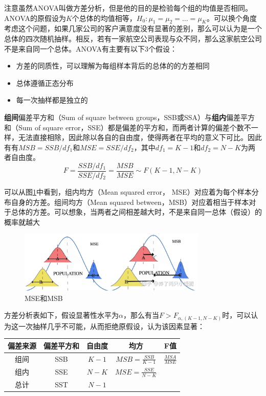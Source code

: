 \documentclass[11pt]{article}
\begin{document}
注意虽然ANOVA叫做方差分析，但是他的目的是检验每个组的均值是否相同。ANOVA的原假设为$K$个总体的均值相等，$H_0: \mu_1 = \mu_2 = \dots = \mu_K$。可以换个角度考虑这个问题，如果几家公司的客户满意度没有显著的差别，那么可以认为是一个总体的四次随机抽样。相反，若有一家航空公司表现与众不同，那么这家航空公司不是来自同一个总体。ANOVA有主要有以下3个假设：
\begin{itemize}
    \item 方差的同质性，可以理解为每组样本背后的总体的的方差相同
    \item 总体遵循正态分布
    \item 每一次抽样都是独立的
\end{itemize}

\textbf{组间}偏差平方和（Sum of square between groups，SSB或SSA）与\textbf{组内}偏差平方和（Sum of square error，SSE）都是偏差的平方和，而两者计算的偏差个数不一样，无法直接相除，因此除以各自的自由度，使得两者在平均的意义下可比。因此有有$MSB = SSB/df_1$和$MSE = SSE/df_2$，其中$df_1=K-1$和$df_2=N-K$为两者自由度。
\begin{equation*}
    F = \frac{SSB/df_1}{SSE/df_2}= \frac{MSB}{MSE} \sim F(K-1,N-K)
\end{equation*}

可以从图\ref{fig:mse-msb}中看到，组内均方（Mean squared error， MSE）对应着为每个样本分布自身的方差。组间均方（Mean squared between，MSB）对应着相当于样本对于总体的方差。可以想象，当两者之间相差越大时，不是来自同一总体（假设）的概率就越大
\begin{figure}[H]
    \centering
    \includegraphics[width=0.8\textwidth]{fig/mse-msb.jpg}
    \caption{MSE和MSB}
    \label{fig:mse-msb}
\end{figure}

方差分析表如下，假设显著性水平为$\alpha$，那么有当$F > F_{\alpha,(K-1,N-K)}$时，可以认为这一次抽样几乎不可能，从而拒绝原假设，认为该因素显著：
\begin{table}[H]
\centering
\begin{tabular}{@{}ccccc@{}}
\toprule
\textbf{偏差来源} & \textbf{偏差平方和} & \textbf{自由度} & \textbf{均方} & \textbf{F值} \\ \midrule
组间 & SSB & $K-1$ & $MSB=\frac{SSB}{K-1}$ & $\frac{MSA}{MSE}$ \\
组内 & SSE & $N-K$ & $MSE=\frac{SSE}{N-K}$ &                   \\
总计 & SST & $N-1$ &                       &                   \\ \bottomrule
\end{tabular}
\end{table}
\end{document}
